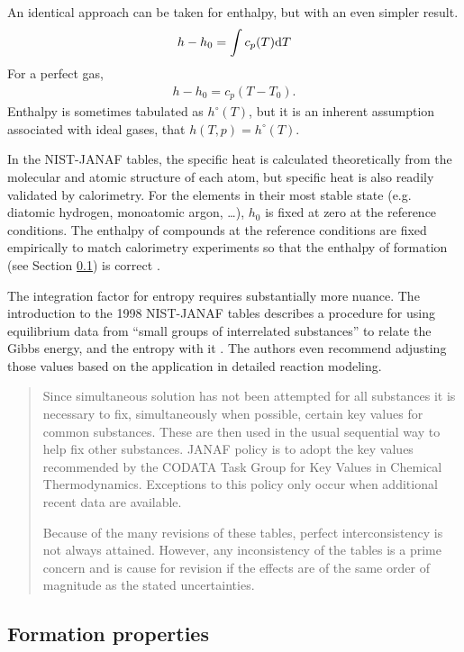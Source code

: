 An identical approach can be taken for enthalpy, but with an even simpler result.  
\begin{align}
h - h_0 = \int c_p(T) \mathrm{d} T \label{eqn:ig:h}
\end{align}
For a perfect gas,
\begin{align}
h - h_0 = c_p \left(T - T_0\right). \label{eqn:pg:h}
\end{align}
Enthalpy is sometimes tabulated as $h^\circ(T)$, but it is an inherent assumption associated with ideal gases, that $h(T,p) = h^\circ(T)$.

In the NIST-JANAF tables, the specific heat is calculated theoretically from the molecular and atomic structure of each atom, but specific heat is also readily validated by calorimetry.  For the elements in their most stable state (e.g. diatomic hydrogen, monoatomic argon, \ldots), $h_0$ is fixed at zero at the reference conditions.  The enthalpy of compounds at the reference conditions are fixed empirically to match calorimetry experiments so that the enthalpy of formation (see Section \ref{sec:ig:hf}) is correct \cite[pg 13]{janaf:1:1998}.

The integration factor for entropy requires substantially more nuance.  The introduction to the 1998 NIST-JANAF tables describes a procedure for using equilibrium data from ``small groups of interrelated substances'' to relate the Gibbs energy, and the entropy with it \cite[pg 14 par 3]{janaf:1:1998}.  The authors even recommend adjusting those values based on the application in detailed reaction modeling.

\begin{quote}
Since simultaneous solution has not been attempted for all substances it is necessary to fix, simultaneously when possible, certain key values for common substances.  These are then used in the usual sequential way to help fix other substances.  JANAF policy is to adopt the key values recommended by the CODATA Task Group for Key Values in Chemical Thermodynamics.  Exceptions to this policy only occur when additional recent data are available.

Because of the many revisions of these tables, perfect interconsistency is not always attained.  However, any inconsistency of the tables is a prime concern and is cause for revision if the effects are of the same order of magnitude as the stated uncertainties. \cite[pg 14]{janaf:1:1998}
\end{quote}

\subsection{Formation properties}\label{sec:ig:hf}

